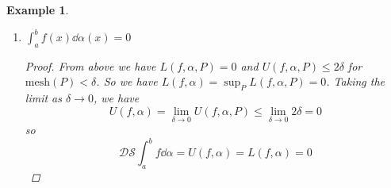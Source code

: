 \documentclass[]{article}
\newtheorem{example}{Example}
\begin{document}
\begin{example}
\begin{enumerate}
\begin{proof}
            The upper Darboux-Stieltjes sum is given by \begin{align*}
                U(f, \alpha, P) 
                    &= \sum_{i=1}^n M(f, [x_{i-1},x_{i}]) \Delta_i \alpha\\
                    &= \sum_{i=1}^n (\sup_{x \in [x_{i-1}, x_i]} f(x)) \Delta_i \alpha\\
                \intertext{since $f(x) = 0 \forall_{i} \neq k$,}
                    &= \sum_{i=1}^{k-1} (0) \Delta_i \alpha\\
                        &\quad + \sum_{i=k+2}^{n} (0) \Delta_i \alpha\\
                        &\quad + \sup_{x \in [x_{k-1}, x_k]} f(x) \Delta_k \alpha\\
                        &\quad + \sup_{x \in [x_{k}, x_{k-1}]} f(x) \Delta_{k+1} \alpha\\
                    &= 0 + 0 + 1 (\Delta_k \alpha) + 1 (\Delta_{k+1} \alpha)\\
                    &= (\alpha(x_{k}) - \alpha(x_{k-1})) + (\alpha(x_{k+1}) - \alpha(x_{k}))\\
                    &= \alpha(x_{k+1}) - \alpha(x_{k-1}\\
                \intertext{since $\text{mesh}(P) < \delta$,}
                    &\leq 2 \delta\\
                U(f, \alpha, P) &\leq 2 \delta
            \end{align*}
            
            Thus, setting $\delta < \frac{\epsilon}{2}$ results in \[
                U(f, \alpha, P) - L(f, \alpha, P) \leq 2\delta < \epsilon
            \]
        \end{proof}
        \item \emph{\underline{\textbf{$\int_{a}^{b} f(x) \dd{\alpha(x)} = 0$}}}
        \begin{proof}
            From above we have $L(f, \alpha, P) = 0$ and $U(f, \alpha, P) \leq 2 \delta$ for $\text{mesh}(P) < \delta$.
            So we have $L(f, \alpha) = \sup_{P} L(f, \alpha, P) = 0$.
            Taking the limit as $\delta \to 0$, we have \[
                U(f, \alpha) = \lim_{\delta \to 0} U(f, \alpha, P) \leq \lim_{\delta \to 0} 2 \delta = 0
            \] so \[
                \mathcal{DS} \int_{a}^{b} f \dd{\alpha} = U(f,\alpha) = L(f, \alpha) = 0
            \]
        \end{proof}
    \end{enumerate}
\end{example}
\end{document}
